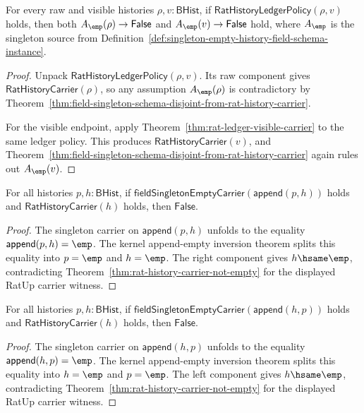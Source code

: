 \begin{theorem}
\label{thm:field-singleton-schema-disjoint-from-rat-ledger}
For every raw and visible histories $\rho,v:\mathsf{BHist}$, if
$\mathsf{RatHistoryLedgerPolicy}(\rho,v)$ holds, then both
$A_{\emp}(\rho)\to\mathsf{False}$ and
$A_{\emp}(v)\to\mathsf{False}$ hold, where $A_{\emp}$ is the singleton source
from Definition~\ref{def:singleton-empty-history-field-schema-instance}.
\end{theorem}
\begin{proof}
Unpack $\mathsf{RatHistoryLedgerPolicy}(\rho,v)$. Its raw component gives
$\mathsf{RatHistoryCarrier}(\rho)$, so any assumption $A_{\emp}(\rho)$ is
contradictory by
Theorem~\ref{thm:field-singleton-schema-disjoint-from-rat-history-carrier}.

For the visible endpoint, apply
Theorem~\ref{thm:rat-ledger-visible-carrier} to the same ledger policy. This
produces $\mathsf{RatHistoryCarrier}(v)$, and
Theorem~\ref{thm:field-singleton-schema-disjoint-from-rat-history-carrier}
again rules out $A_{\emp}(v)$.
\end{proof}

\begin{theorem}
\label{thm:field-singleton-empty-append-rat-carrier-absurd}
For all histories $p,h:\mathsf{BHist}$, if
$\mathsf{fieldSingletonEmptyCarrier}(\mathsf{append}(p,h))$ holds and
$\mathsf{RatHistoryCarrier}(h)$ holds, then $\mathsf{False}$.
\end{theorem}
\begin{proof}
The singleton carrier on $\mathsf{append}(p,h)$ unfolds to the equality
$\mathsf{append}(p,h)=\emp$. The kernel append-empty inversion theorem splits
this equality into $p=\emp$ and $h=\emp$. The right component gives
$h\hsame\emp$, contradicting
Theorem~\ref{thm:rat-history-carrier-not-empty} for the displayed RatUp carrier
witness.
\end{proof}

\begin{theorem}
\label{thm:field-singleton-empty-append-left-rat-carrier-absurd}
For all histories $p,h:\mathsf{BHist}$, if
$\mathsf{fieldSingletonEmptyCarrier}(\mathsf{append}(h,p))$ holds and
$\mathsf{RatHistoryCarrier}(h)$ holds, then $\mathsf{False}$.
\end{theorem}
\begin{proof}
The singleton carrier on $\mathsf{append}(h,p)$ unfolds to the equality
$\mathsf{append}(h,p)=\emp$. The kernel append-empty inversion theorem splits
this equality into $h=\emp$ and $p=\emp$. The left component gives
$h\hsame\emp$, contradicting
Theorem~\ref{thm:rat-history-carrier-not-empty} for the displayed RatUp carrier
witness.
\end{proof}

